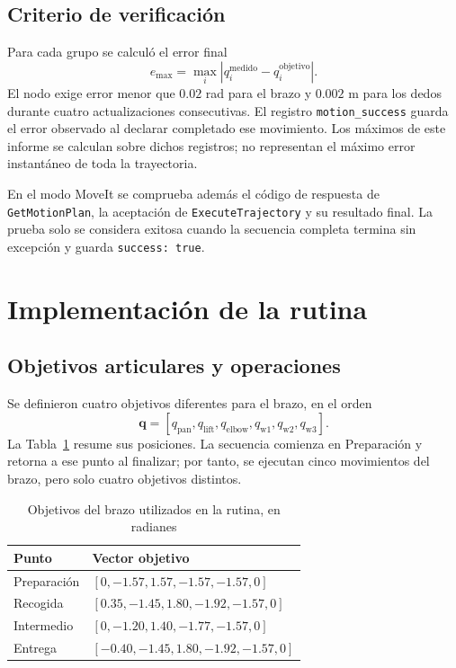 \documentclass[conference]{IEEEtran}
\begin{document}
\subsection{Criterio de verificación}
Para cada grupo se calculó el error final
\begin{equation}
 e_{\max}=\max_i\left|q_i^{\mathrm{medido}}-q_i^{\mathrm{objetivo}}\right|.
 \label{eq:error}
\end{equation}
El nodo exige error menor que $0.02$ rad para el brazo y $0.002$ m
para los dedos durante cuatro actualizaciones consecutivas.
El registro \texttt{motion\_success} guarda el error observado al
declarar completado ese movimiento. Los máximos de este informe se
calculan sobre dichos registros; no representan el máximo error
instantáneo de toda la trayectoria.

En el modo MoveIt se comprueba además el código de respuesta de
\texttt{GetMotionPlan}, la aceptación de \texttt{ExecuteTrajectory}
y su resultado final. La prueba solo se considera exitosa cuando
la secuencia completa termina sin excepción y guarda
\texttt{success: true}.

\section{Implementación de la rutina}
\subsection{Objetivos articulares y operaciones}
Se definieron cuatro objetivos diferentes para el brazo, en el orden
\[
 \mathbf q=[q_{\mathrm{pan}},q_{\mathrm{lift}},q_{\mathrm{elbow}},
 q_{\mathrm{w1}},q_{\mathrm{w2}},q_{\mathrm{w3}}].
\]
La Tabla~\ref{tab:poses} resume sus posiciones. La secuencia comienza en
Preparación y retorna a ese punto al finalizar; por tanto, se ejecutan
cinco movimientos del brazo, pero solo cuatro objetivos distintos.

\begin{table}[t]
\caption{Objetivos del brazo utilizados en la rutina, en radianes}
\label{tab:poses}
\centering
\scriptsize
\begin{tabular}{@{}lp{}@{}}
\toprule
Punto & Vector objetivo\\
\midrule
Preparación & $[0,-1.57,1.57,-1.57,-1.57,0]$\\
Recogida & $[0.35,-1.45,1.80,-1.92,-1.57,0]$\\
Intermedio & $[0,-1.20,1.40,-1.77,-1.57,0]$\\
Entrega & $[-0.40,-1.45,1.80,-1.92,-1.57,0]$\\
\bottomrule
\end{tabular}
\end{table}
\end{document}
